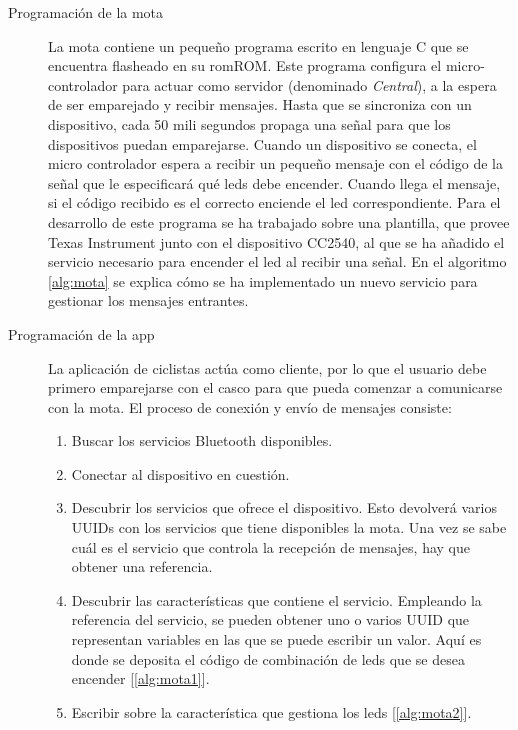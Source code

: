 \begin{description}
	\item[Programación de la mota] La mota contiene un pequeño programa escrito en
	lenguaje C que se	encuentra flasheado en su \gls{rom}ROM. Este programa configura
	el micro-controlador para actuar como servidor (denominado \emph{Central}), a
	la espera de ser emparejado y recibir mensajes. Hasta que se sincroniza con un
	dispositivo, cada 50 mili segundos propaga una señal para que los dispositivos
	puedan emparejarse. Cuando un dispositivo se conecta, el micro controlador espera
	a recibir un pequeño mensaje con el código de la señal que le especificará qué
	leds debe encender. Cuando llega el mensaje, si el código recibido es el correcto
	enciende el led correspondiente. Para el desarrollo de este programa se ha trabajado
	sobre una plantilla, que provee Texas Instrument junto con el dispositivo CC2540,
	al que se ha añadido el servicio necesario para encender el led al recibir una
	señal. En el algoritmo \ref{alg:mota} se explica cómo se ha implementado un nuevo
	servicio para gestionar los mensajes entrantes.

	\item[Programación de la app] La aplicación de ciclistas actúa como cliente, por
	lo que el usuario debe primero emparejarse con el casco para que pueda comenzar
	a comunicarse con la mota. El proceso de conexión y envío	de mensajes consiste:
		\begin{enumerate}
			\item Buscar los servicios Bluetooth disponibles.

			\item Conectar al dispositivo en cuestión.

			\item Descubrir los servicios que ofrece el dispositivo. Esto devolverá varios
			UUIDs con los servicios que tiene disponibles la mota. Una vez se sabe cuál
			es el servicio que controla la recepción de mensajes, hay que obtener	una
			referencia.

			\item Descubrir las características que contiene el servicio. Empleando la
			referencia del servicio, se pueden obtener uno o varios UUID que representan
			variables en las que se puede escribir un valor. Aquí es donde se deposita
			el código de combinación de leds que se desea encender [\ref{alg:mota1}].

			\item Escribir sobre la característica que gestiona los leds [\ref{alg:mota2}].
		\end{enumerate}


\end{description}
